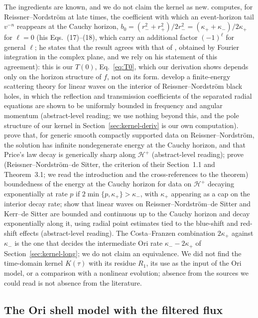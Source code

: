 \documentclass[11pt]{article}
\begin{document}
The ingredients are known, and we do not claim the kernel as new. \citet{Ori1998} computes, for Reissner--Nordstr\"om at late times, the coefficient with which an event-horizon tail $v^{-n}$ reappears at the Cauchy horizon, $b_0=(r_-^2+r_+^2)/2r_-^2=(\kappa_++\kappa_-)/2\kappa_+$ for $\ell=0$ (his Eqs.~(17)--(18), which carry an additional factor $(-1)^\ell$ for general $\ell$; he states that the result agrees with that of \citealt{Gursel1979}, obtained by Fourier integration in the complex plane, and we rely on his statement of this agreement): this is our $T(0)$, Eq.~\eqref{eq:T0}, which our derivation shows depends only on the horizon structure of $f$, not on its form. \citet{KehleShlapentokhRothman2019} develop a finite-energy scattering theory for linear waves on the interior of Reissner--Nordstr\"om black holes, in which the reflection and transmission coefficients of the separated radial equations are shown to be uniformly bounded in frequency and angular momentum (abstract-level reading; we use nothing beyond this, and the pole structure of our kernel in Section~\ref{sec:kernel-deriv} is our own computation). \citet{LukOh2017} prove that, for generic smooth compactly supported data on Reissner--Nordstr\"om, the solution has infinite nondegenerate energy at the Cauchy horizon, and that Price's law decay is generically sharp along $\mathcal H^+$ (abstract-level reading); \citet{CostaFranzen2017} prove (Reissner--Nordstr\"om--de Sitter, the criterion of their Section~1.1 and Theorem~3.1; we read the introduction and the cross-references to the theorem) boundedness of the energy at the Cauchy horizon for data on $\mathcal H^+$ decaying exponentially at rate $p$ if $2\min\{p,\kappa_+\}>\kappa_-$, with $\kappa_+$ appearing as a cap on the interior decay rate; \citet{HintzVasy2017} show that linear waves on Reissner--Nordstr\"om--de Sitter and Kerr--de Sitter are bounded and continuous up to the Cauchy horizon and decay exponentially along it, using radial point estimates tied to the blue-shift and red-shift effects (abstract-level reading). The Costa--Franzen combination $2\kappa_+$ against $\kappa_-$ is the one that decides the intermediate Ori rate $\kappa_--2\kappa_+$ of Section~\ref{sec:kernel-long}; we do not claim an equivalence. We did not find the time-domain kernel $K(\tau)$ with its residue $R_1$, its use as the input of the Ori model, or a comparison with a nonlinear evolution; absence from the sources we could read is not absence from the literature.

\subsection{The Ori shell model with the filtered flux}
\label{sec:kernel-shell}
\end{document}
